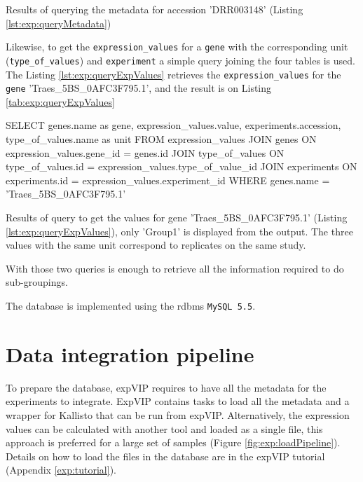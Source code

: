 \begin{table}[h]
\caption[Results of query for metadata]{Results of querying the metadata for accession 'DRR003148' (Listing \ref{lst:exp:queryMetadata})}
\label{tab:exp:queryMetadata}

\end{table}

Likewise, to get the \texttt{expression\_values} for a \texttt{gene} with the corresponding unit (\texttt{type\_of\_values}) and \texttt{experiment} a simple query joining the four tables is used. 
The Listing \ref{lst:exp:queryExpValues} retrieves the \texttt{expression\_values} for the \texttt{gene} 'Traes\_5BS\_0AFC3F795.1', and the result is on Listing \ref{tab:exp:queryExpValues}

\begin{code}[language=sql, caption={[Query values for gene and experiment group] Query values from 'Group1' and gene 'Traes\_5BS\_0AFC3F795.1' },label=lst:exp:queryExpValues]
SELECT 
	genes.name as gene, 
	expression_values.value,
	experiments.accession,
	type_of_values.name as unit
FROM expression_values
JOIN genes 
	ON expression_values.gene_id = genes.id
JOIN type_of_values 
	ON type_of_values.id = expression_values.type_of_value_id
JOIN experiments 
	ON experiments.id = expression_values.experiment_id
WHERE 
	genes.name = 'Traes_5BS_0AFC3F795.1' 
\end{code}

\begin{table}[h]
\caption[Results of query for values]{Results of query to get the values for gene 'Traes\_5BS\_0AFC3F795.1' (Listing \ref{lst:exp:queryExpValues}), only 'Group1' is displayed from the output. The three values with the same unit correspond to replicates on the same study.}
\label{tab:exp:queryExpValues}

\end{table}

With those two queries is enough to retrieve all the information required to do sub-groupings. 

The database is implemented using the \acrshort{rdbms} \texttt{MySQL 5.5}. 



\section{Data integration pipeline} 
\label{exp:pipeline}


To prepare the database, expVIP requires to have all the metadata for the experiments to integrate. 
ExpVIP contains tasks to load all the metadata and a wrapper for Kallisto that can be run from expVIP. 
Alternatively, the expression values can be calculated with another tool and loaded as a single file, this approach is preferred for a large set of samples (Figure \ref{fig:exp:loadPipeline}). 
Details on how to load the files in the database are in the expVIP tutorial (Appendix \ref{exp:tutorial}). 

